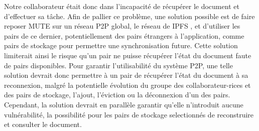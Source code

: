 Notre collaborateur était donc dans l'incapacité de récupérer le document et d'effectuer sa tâche.
Afin de pallier ce problème, une solution possible est de faire reposer \ac{MUTE} sur un réseau \ac{P2P} global, \eg le réseau de \ac{IPFS} \cite{ipfs}, et d'utiliser les pairs de ce dernier, potentiellement des pairs étrangers à l'application, comme pairs de stockage pour permettre une synchronisation future.
Cette solution limiterait ainsi le risque qu'un pair ne puisse récupérer l'état du document faute de pairs disponibles.
Pour garantir l'utilisabilité du système \ac{P2P}, une telle solution devrait donc permettre à un pair de récupérer l'état du document à sa reconnexion, malgré la potentielle évolution du groupe des collaborateur-rices et des pairs de stockage, \eg l'ajout, l'éviction ou la déconnexion d'un des pairs.
Cependant, la solution devrait en parallèle garantir qu'elle n'introduit aucune vulnérabilité, \eg la possibilité pour les pairs de stockage selectionnés de reconstruire et consulter le document.
